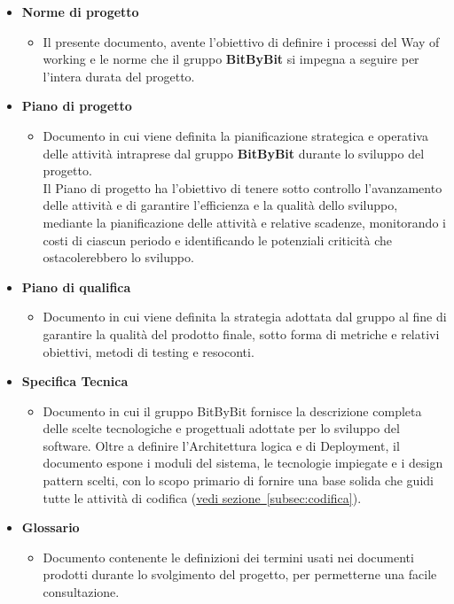 \documentclass[a4paper,12pt]{article}
\begin{document}
\begin{itemize}
    \item \textbf{Norme di progetto}
    \begin{itemize}
        \item Il presente documento, avente l'obiettivo di definire i processi del Way of working e le norme che il gruppo \textbf{BitByBit} si impegna a seguire per l'intera durata del progetto.
    \end{itemize}

    \item \textbf{Piano di progetto}
    \begin{itemize}
        \item Documento in cui viene definita la pianificazione strategica e operativa delle attività intraprese dal gruppo \textbf{BitByBit} durante lo sviluppo del progetto. 
        \\Il Piano di progetto ha l’obiettivo di tenere sotto controllo l’avanzamento delle attività e di garantire l’efficienza e la qualità dello sviluppo, mediante la pianificazione delle attività e relative scadenze, monitorando i costi di ciascun periodo e identificando le potenziali criticità che ostacolerebbero lo sviluppo.
    \end{itemize}
    
    \item \textbf{Piano di qualifica}
    \begin{itemize}
        \item Documento in cui viene definita la strategia adottata dal gruppo al fine di garantire la qualità del prodotto finale, sotto forma di metriche e relativi obiettivi, metodi di testing e resoconti.
    \end{itemize}

    \item \textbf{Specifica Tecnica}
    \begin{itemize}
        \item Documento in cui il gruppo BitByBit fornisce la descrizione completa delle scelte tecnologiche e progettuali adottate per lo sviluppo del software. Oltre a definire l'Architettura logica e di Deployment, il documento espone i moduli del sistema, le tecnologie impiegate e i design pattern scelti, con lo scopo primario di fornire una base solida che guidi tutte le attività di codifica (\hyperref[subsec:codifica]{vedi sezione~\ref*{subsec:codifica}}).
    \end{itemize}
    
    \item \textbf{Glossario}
    \begin{itemize}
        \item Documento contenente le definizioni dei termini usati nei documenti prodotti durante lo svolgimento del progetto, per permetterne una facile consultazione.
    \end{itemize}
\end{itemize}
\end{document}
